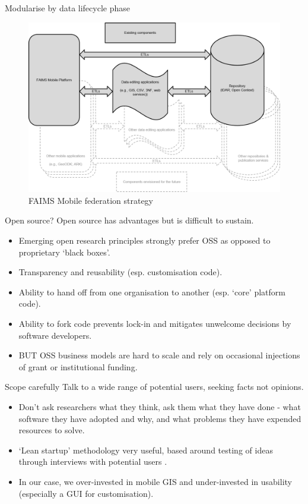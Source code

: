 \documentclass[aspectratio=169, 12pt]{beamer} %
\begin{document}
\begin{frame}{Modularise by data lifecycle phase}
 \begin{figure}[H]
    \centering
        \includegraphics[height=.75\textheight]{figures/FAIMS-federated.png}
        \caption{FAIMS Mobile federation strategy}
        \label{fig:figure13}
 \end{figure}
\end{frame}

\begin{frame}{Open source?}
  Open source has advantages but is difficult to sustain.
      \begin{itemize}[label=\textbullet]
        \item Emerging open research principles strongly prefer OSS as opposed to proprietary ‘black boxes’.
        \item Transparency and reusability (esp. customisation code).
        \item Ability to hand off from one organisation to another (esp. `core' platform code).
        \item Ability to fork code prevents lock-in and mitigates unwelcome decisions by software developers.
        \item BUT OSS business models are hard to scale and rely on occasional injections of grant or institutional funding.
    \end{itemize}
\end{frame}

\begin{frame}{Scope carefully}
  Talk to a wide range of potential users, seeking facts not opinions.
      \begin{itemize}[label=\textbullet]
        \item Don’t ask researchers what they think, ask them what they have done - what software they have adopted and why, and what problems they have expended resources to solve. 
        \item ‘Lean startup’ methodology very useful, based around  testing of ideas through interviews with potential users \cite{Strategyzer_AG2019-uu}.
        \item In our case, we over-invested in mobile GIS and under-invested in usability (especially a GUI for customisation).
    \end{itemize}
\end{frame}
\end{document}
